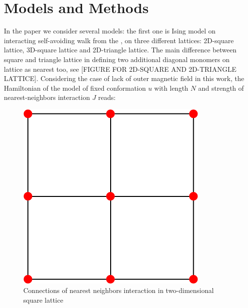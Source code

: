 \documentclass[aps,pre,amssymb,amsmath,twocolumn,floatfix]{revtex4-2}
\begin{document}
\section{Models and Methods}
In the paper we consider several models: the first one is Ising model on interacting self-avoiding walk from the \cite{faizullina2021critical}, on three different lattices: 2D-square lattice, 3D-square lattice and 2D-triangle lattice. The main difference between square and triangle lattice in defining two additional diagonal monomers on lattice as nearest too, see [FIGURE FOR 2D-SQUARE AND 2D-TRIANGLE LATTICE]. Considering the case of lack of outer magnetic field in this work, the Hamiltonian of the model of fixed conformation $u$ with length $N$ and strength of nearest-neighbors interaction $J$ reads:

\begin{figure}[h!]
\begin{minipage}{0.45\columnwidth}
    \includegraphics[width=\textwidth]{Images/SqLattice.png}
    \caption{Connections of nearest neighbors interaction in two-dimensional square lattice}
    \label{fig:ISAW_A_J_Zoom}
\end{minipage}
\hfill
\begin{minipage}{0.45\columnwidth}

\end{minipage}
\end{figure}
\end{document}
